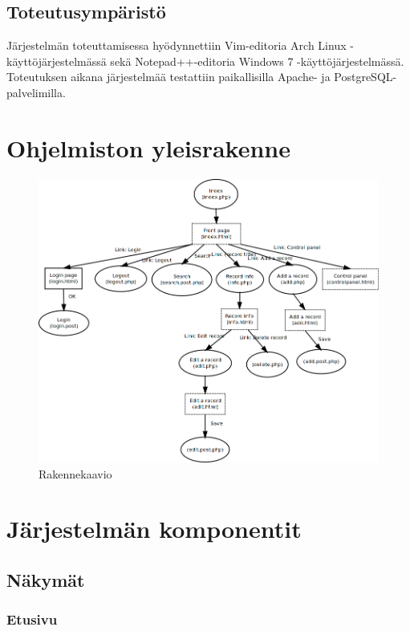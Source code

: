 \documentclass[a4paper,12pt]{report}
\begin{document}
\subsection{Toteutusympäristö}

Järjestelmän toteuttamisessa hyödynnettiin Vim-editoria Arch Linux
-käyttöjärjestelmässä sekä Notepad++-editoria Windows 7
-käyttöjärjestelmässä. Toteutuksen aikana järjestelmää testattiin
paikallisilla Apache- ja PostgreSQL-palvelimilla.

\section{Ohjelmiston yleisrakenne}

\begin{figure}[H]
  \begin{center}
    \includegraphics[width=\textwidth]{diagrams/rakennekaavio}
  \end{center}
  \caption{Rakennekaavio}
\end{figure}

\section{Järjestelmän komponentit}

\subsection{Näkymät}

\subsubsection{Etusivu}
\end{document}
